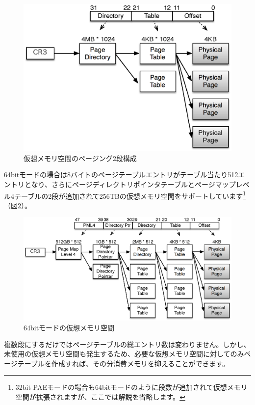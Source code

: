 \documentclass[a4j,12pt]{jarticle}
\begin{document}
\begin{figure}
\includegraphics{figures/part2_fig4.eps}
\caption{仮想メモリ空間のページング2段構成}
\label{fig4}
\end{figure}

64bitモードの場合は8バイトのページテーブルエントリがテーブル当たり512エントリとなり、さらにページディレクトリポインタテーブルとページマップレベル4テーブルの2段が追加されて256TBの仮想メモリ空間をサポートしています\footnote{32bit PAEモードの場合も64bitモードのように段数が追加されて仮想メモリ空間が拡張されますが、ここでは解説を省略します。}（図\ref{fig5}）。

\begin{figure}
\includegraphics[width=1.0\textwidth]{figures/part2_fig5.eps}
\caption{64bitモードの仮想メモリ空間}
\label{fig5}
\end{figure}

複数段にするだけではページテーブルの総エントリ数は変わりません。しかし、未使用の仮想メモリ空間も発生するため、必要な仮想メモリ空間に対してのみページテーブルを作成すれば、その分消費メモリを抑えることができます。
\end{document}
